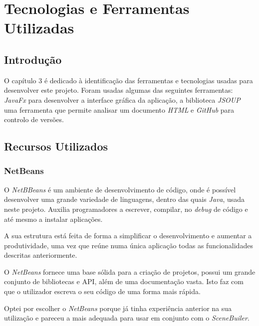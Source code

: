 \chapter{Tecnologias e Ferramentas Utilizadas}
\label{chap:tecno-ferra}

\section{Introdução}
\label{chap3:sec:intro}
O capítulo 3 é dedicado à identificação das ferramentas e tecnologias usadas para desenvolver este projeto. Foram usadas algumas das seguintes ferramentas: \emph{JavaFx} para desenvolver a interface gráfica da aplicação, a biblioteca \emph{JSOUP} uma ferramenta que permite analisar um documento \emph{HTML} e \emph{GitHub} para controlo de versões.

\section{Recursos Utilizados}
\label{chap3:sec:...}

\subsection{NetBeans}
O \emph{NetBBeans} é um ambiente de desenvolvimento de código, onde é possível desenvolver uma grande variedade de linguagens, dentro das quais \emph{Java}, usada neste projeto.
Auxilia programadores a escrever, compilar, no \emph{debug} de código e até mesmo a instalar aplicações. \par
A sua estrutura está feita de forma a simplificar o desenvolvimento e aumentar a produtividade, uma vez que reúne numa única aplicação todas as funcionalidades descritas anteriormente.\par
O \emph{NetBeans} fornece uma base sólida para a criação de projetos, possui um grande conjunto de bibliotecas e \ac{API}, além de uma documentação vasta. Isto faz com que o utilizador escreva o seu código de uma forma mais rápida. \par
Optei por escolher o \emph{NetBeans} porque já tinha experiência anterior na sua utilização e pareceu a mais adequada para usar em conjunto com o \emph{SceneBuiler}.


